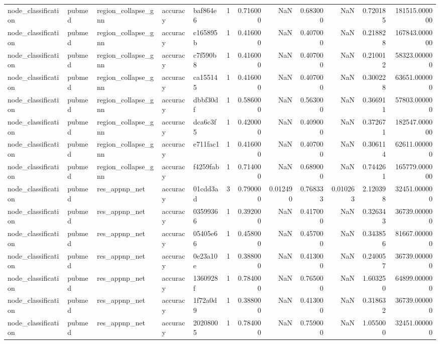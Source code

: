\begin{tabular}{lllllrrrrrrr}
node_classification & pubmed & region_collapse_gnn & accuracy & baf864e6 & 1 & 0.716000 & NaN & 0.683000 & NaN & 0.720185 & 181515.000000 \\
node_classification & pubmed & region_collapse_gnn & accuracy & c165895b & 1 & 0.416000 & NaN & 0.407000 & NaN & 0.218828 & 167843.000000 \\
node_classification & pubmed & region_collapse_gnn & accuracy & c7f590b8 & 1 & 0.416000 & NaN & 0.407000 & NaN & 0.210012 & 58323.000000 \\
node_classification & pubmed & region_collapse_gnn & accuracy & ca155145 & 1 & 0.416000 & NaN & 0.407000 & NaN & 0.300228 & 63651.000000 \\
node_classification & pubmed & region_collapse_gnn & accuracy & dbbf30df & 1 & 0.586000 & NaN & 0.563000 & NaN & 0.366911 & 57803.000000 \\
node_classification & pubmed & region_collapse_gnn & accuracy & dca6c3f5 & 1 & 0.420000 & NaN & 0.409000 & NaN & 0.372671 & 182547.000000 \\
node_classification & pubmed & region_collapse_gnn & accuracy & e711fac1 & 1 & 0.416000 & NaN & 0.407000 & NaN & 0.306114 & 62611.000000 \\
node_classification & pubmed & region_collapse_gnn & accuracy & f4259fab & 1 & 0.714000 & NaN & 0.689000 & NaN & 0.744261 & 165779.000000 \\
node_classification & pubmed & res_appnp_net & accuracy & 01cdd3ad & 3 & 0.790000 & 0.012490 & 0.768333 & 0.010263 & 2.120398 & 32451.000000 \\
node_classification & pubmed & res_appnp_net & accuracy & 03599366 & 1 & 0.392000 & NaN & 0.417000 & NaN & 0.326343 & 36739.000000 \\
node_classification & pubmed & res_appnp_net & accuracy & 05405e66 & 1 & 0.458000 & NaN & 0.457000 & NaN & 0.343856 & 81667.000000 \\
node_classification & pubmed & res_appnp_net & accuracy & 0e23a10e & 1 & 0.388000 & NaN & 0.413000 & NaN & 0.240057 & 36739.000000 \\
node_classification & pubmed & res_appnp_net & accuracy & 1360928f & 1 & 0.784000 & NaN & 0.765000 & NaN & 1.603250 & 64899.000000 \\
node_classification & pubmed & res_appnp_net & accuracy & 1f72a0d9 & 1 & 0.388000 & NaN & 0.413000 & NaN & 0.318632 & 36739.000000 \\
node_classification & pubmed & res_appnp_net & accuracy & 20208005 & 1 & 0.784000 & NaN & 0.759000 & NaN & 1.055000 & 32451.000000 \\

\end{tabular}
